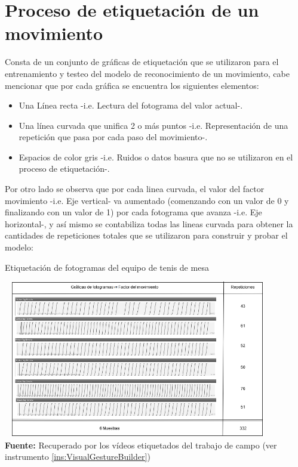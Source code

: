 \section{Proceso de etiquetaci\'on de un movimiento}
Consta de un conjunto de gr\'aficas de etiquetaci\'on que se utilizaron para el entrenamiento y testeo del modelo de reconocimiento de un  movimiento, cabe mencionar que por cada gr\'afica se encuentra los siguientes elementos:
\begin{itemize}
\item Una L\'inea recta -i.e. Lectura del fotograma del valor actual-.
\item Una l\'inea curvada que unifica 2 o m\'as puntos -i.e. Representaci\'on de una repetici\'on que pasa por cada paso del movimiento-.
\item Espacios de color gris -i.e. Ruidos o datos basura que no se utilizaron en el proceso de etiquetaci\'on-.
\end{itemize}
Por otro lado se observa que por cada linea curvada, el valor del factor movimiento -i.e. Eje vertical- va aumentado (comenzando con un valor de 0 y finalizando con un valor de 1) por cada fotograma que avanza -i.e. Eje horizontal-, y as\'i mismo se contabiliza todas las lineas curvada para obtener la cantidades de repeticiones totales que se utilizaron para construir y probar el modelo: 
\begin{chart}[H]
	\caption{Etiquetaci\'on de fotogramas del equipo de tenis de mesa}
	\label{fig:etiquetaTenis}
	\centering
	\includegraphics[width=445px,height=260px]{graphics/resultados/GraSegTenisDeMesa.PNG} \\
	\textbf{Fuente:} Recuperado por los v\'ideos etiquetados del trabajo de campo (ver instrumento \ref{ins:VisualGestureBuilder})
\end{chart}
